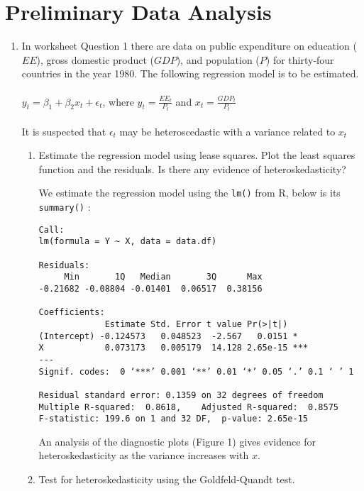 \documentclass[12pt]{article}
\begin{document}
\section{Preliminary Data Analysis}
\begin{enumerate}
\item In worksheet Question 1 there are data on public expenditure on education ($EE$), gross domestic product ($GDP$), and population ($P$) for thirty-four countries in the year 1980. The following regression model is to be estimated.
\\ \\
$y_t = \beta_1 + \beta_2 x_t + \epsilon_t$, where $y_t = \frac{EE_t}{P_t}$ and $x_t=\frac{GDP_t}{P_t}$
\\ \\
It is suspected that $\epsilon_t$ may be heteroscedastic with a variance related to $x_t$
\begin{enumerate}
\item Estimate the regression model using lease squares. Plot the least squares function and the residuals. Is there any evidence of heteroskedasticity?

\begin{Answer}

We estimate the regression model using the \verb|lm()| from R, below is its \verb|summary()| :

\begin{verbatim}
Call:
lm(formula = Y ~ X, data = data.df)

Residuals:
     Min       1Q   Median       3Q      Max 
-0.21682 -0.08804 -0.01401  0.06517  0.38156 

Coefficients:
             Estimate Std. Error t value Pr(>|t|)    
(Intercept) -0.124573   0.048523  -2.567   0.0151 *  
X            0.073173   0.005179  14.128 2.65e-15 ***
---
Signif. codes:  0 ‘***’ 0.001 ‘**’ 0.01 ‘*’ 0.05 ‘.’ 0.1 ‘ ’ 1

Residual standard error: 0.1359 on 32 degrees of freedom
Multiple R-squared:  0.8618,	Adjusted R-squared:  0.8575 
F-statistic: 199.6 on 1 and 32 DF,  p-value: 2.65e-15
\end{verbatim}

An analysis of the diagnostic plots (Figure 1) gives evidence for heteroskedasticity as the variance increases with $x$.

\end{Answer}

\item Test for heteroskedasticity using the Goldfeld-Quandt test.


\end{enumerate}
\end{enumerate}
\end{document}
